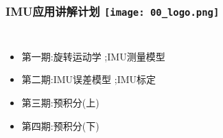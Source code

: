 



\begin{frame}
  \frametitle{IMU应用讲解计划 \hfill \texttt{[image: 00\_logo.png]}}
  \begin{columns}
    
    \begin{itemize}
      \item 第一期:旋转运动学 ;\quad IMU测量模型
      
      \item {\color{red}第二期:IMU误差模型 ;\quad IMU标定}

      \item 第三期:预积分(上)
      
      \item 第四期:预积分(下)


    \end{itemize}
    

  
  \end{columns}
  \end{frame}   